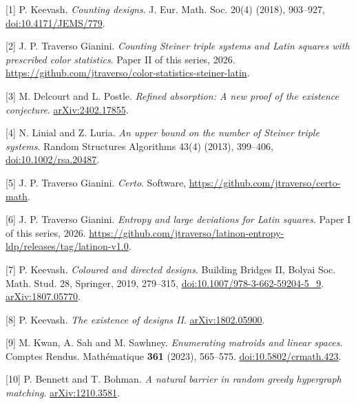\documentclass[spanish,11pt,a4paper]{article}
\begin{document}
{[}1{]} P. Keevash. \emph{Counting designs}. J. Eur. Math. Soc. 20(4) (2018), 903--927, \href{https://doi.org/10.4171/JEMS/779}{doi:10.4171/JEMS/779}.

{[}2{]} J. P. Traverso Gianini. \emph{Counting Steiner triple systems and Latin squares with prescribed color statistics}. Paper II of this series, 2026. \url{https://github.com/jtraverso/color-statistics-steiner-latin}.

{[}3{]} M. Delcourt and L. Postle. \emph{Refined absorption: A new proof of the existence conjecture}. \href{https://arxiv.org/abs/2402.17855}{arXiv:2402.17855}.

{[}4{]} N. Linial and Z. Luria. \emph{An upper bound on the number of Steiner triple systems}. Random Structures Algorithms 43(4) (2013), 399--406, \href{https://doi.org/10.1002/rsa.20487}{doi:10.1002/rsa.20487}.

{[}5{]} J. P. Traverso Gianini. \emph{Certo}. Software, \url{https://github.com/jtraverso/certo-math}.

{[}6{]} J. P. Traverso Gianini. \emph{Entropy and large deviations for Latin squares}. Paper I of this series, 2026. \url{https://github.com/jtraverso/latinon-entropy-ldp/releases/tag/latinon-v1.0}.

{[}7{]} P. Keevash. \emph{Coloured and directed designs}. Building Bridges II, Bolyai Soc. Math. Stud. 28, Springer, 2019, 279--315, \href{https://doi.org/10.1007/978-3-662-59204-5_9}{doi:10.1007/978-3-662-59204-5\_9}. \href{https://arxiv.org/abs/1807.05770}{arXiv:1807.05770}.

{[}8{]} P. Keevash. \emph{The existence of designs II}. \href{https://arxiv.org/abs/1802.05900}{arXiv:1802.05900}.

{[}9{]} M. Kwan, A. Sah and M. Sawhney. \emph{Enumerating matroids and linear spaces}. Comptes Rendus. Mathématique \textbf{361} (2023), 565--575. \href{https://doi.org/10.5802/crmath.423}{doi:10.5802/crmath.423}.

{[}10{]} P. Bennett and T. Bohman. \emph{A natural barrier in random greedy hypergraph matching}. \href{https://arxiv.org/abs/1210.3581}{arXiv:1210.3581}.
\end{document}
